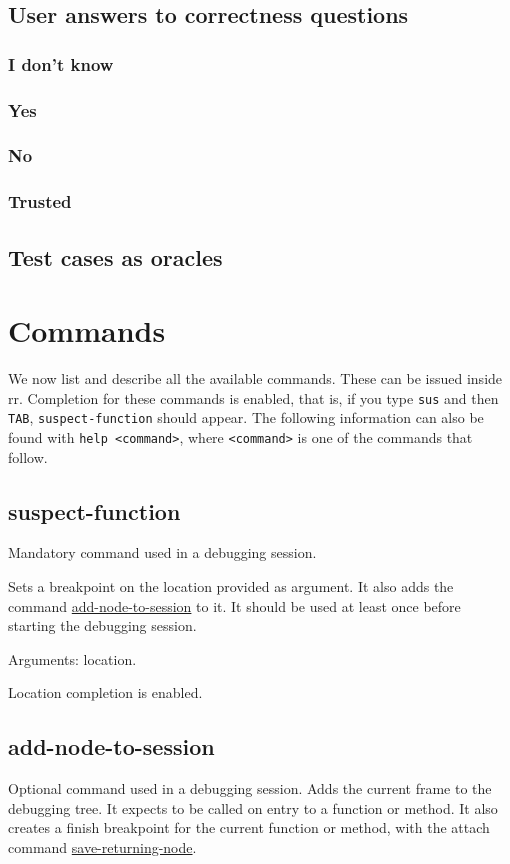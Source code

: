 \subsection{User answers to correctness questions}
\subsubsection{I don't know}
\subsubsection{Yes}
\subsubsection{No}
\subsubsection{Trusted}
\subsection{Test cases as oracles}
\section{Commands}
We now list and describe all the available commands. These can be issued inside rr. Completion for these commands is enabled, that is, if you type \verb|sus| and then \verb|TAB|, \verb|suspect-function| should appear.
The following information can also be found with \verb|help <command>|, where \verb|<command>| is one of the commands that follow.

\subsection{suspect-function}
\label{command:suspect-function}
Mandatory command used in a debugging session.

Sets a breakpoint on the location provided as argument. It also adds the command \hyperref[command:add-node-to-session]{add-node-to-session} to it.
It should be used at least once before starting the debugging session.

Arguments: location.

Location completion is enabled.
\subsection{add-node-to-session}
\label{command:add-node-to-session}
Optional command used in a debugging session.
Adds the current frame to the debugging tree.
It expects to be called on entry to a function or method.
It also creates a finish breakpoint for the current function or method, with the attach command \hyperref[command:save-returning-node]{save-returning-node}.

